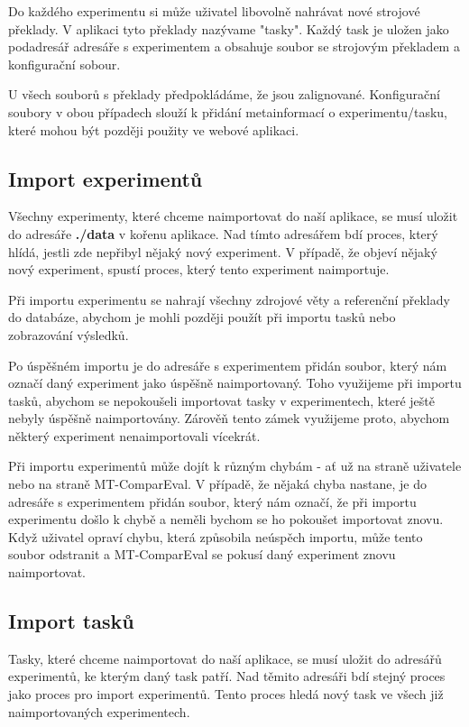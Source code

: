 Do každého experimentu si může uživatel libovolně nahrávat nové strojové překlady.
V aplikaci tyto překlady nazývame "tasky".
Každý task je uložen jako podadresář adresáře s experimentem
  a obsahuje soubor se strojovým překladem
  a konfigurační sobour. 

U všech souborů s překlady předpokládáme, že jsou zalignované.
Konfigurační soubory v obou případech slouží k přidání metainformací o experimentu/tasku,
  které mohou být později použity ve webové aplikaci.

\subsection{Import experimentů}
Všechny experimenty, které chceme naimportovat do naší aplikace,
  se musí uložit do adresáře \textbf{./data} v kořenu aplikace.
Nad tímto adresářem bdí proces, který hlídá,
  jestli zde nepřibyl nějaký nový experiment.
V případě, že objeví nějaký nový experiment,
  spustí proces, který tento experiment naimportuje.

Při importu experimentu se nahrají všechny zdrojové věty
  a referenční překlady do databáze,
  abychom je mohli později použít při importu tasků
  nebo zobrazování výsledků.

Po úspěšném importu je do adresáře s experimentem přidán soubor,
  který nám označí daný experiment jako úspěšně naimportovaný.
Toho využijeme při importu tasků,
  abychom se nepokoušeli importovat tasky v experimentech,
  které ještě nebyly úspěšně naimportovány.
Zárověň tento zámek využijeme proto,
  abychom některý experiment nenaimportovali vícekrát.

Při importu experimentů může dojít k různým chybám -
  ať už na straně uživatele nebo na straně MT-ComparEval.
V případě, že nějaká chyba nastane,
  je do adresáře s experimentem přidán soubor,
  který nám označí,
  že při importu experimentu došlo k chybě
  a neměli bychom se ho pokoušet importovat znovu.
Když uživatel opraví chybu,
  která způsobila neúspěch importu,
  může tento soubor odstranit
  a MT-ComparEval se pokusí daný experiment znovu naimportovat.

\subsection{Import tasků}
Tasky, které chceme naimportovat do naší aplikace,
  se musí uložit do adresářů experimentů,
  ke kterým daný task patří.
Nad těmito adresáři bdí stejný proces
  jako proces pro import experimentů.
Tento proces hledá nový task ve všech již 
  naimportovaných experimentech.

